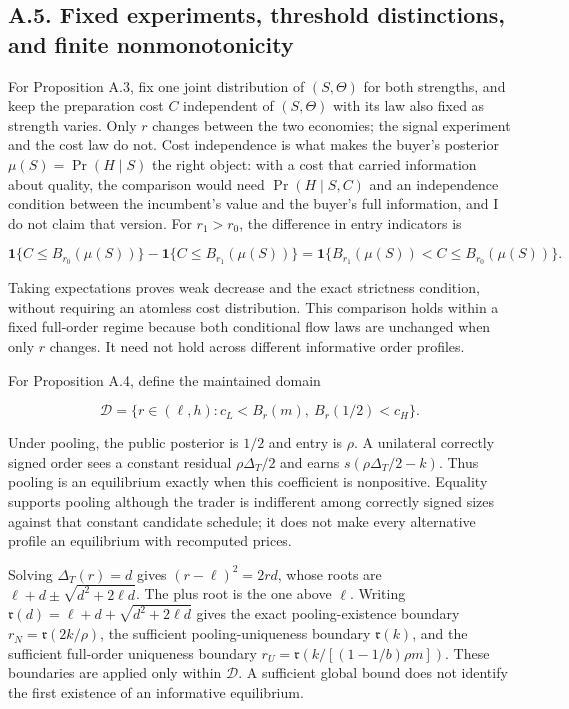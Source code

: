 \documentclass[
  11pt,
]{article}
\begin{document}
\subsection{A.5. Fixed experiments, threshold distinctions, and finite
nonmonotonicity}\label{oa-a-thresholds}

For Proposition A.3, fix one joint distribution of \((S,\Theta)\) for
both strengths, and keep the preparation cost \(C\) independent of
\((S,\Theta)\) with its law also fixed as strength varies. Only \(r\)
changes between the two economies; the signal experiment and the cost
law do not. Cost independence is what makes the buyer's posterior
\(\mu(S)=\Pr(H\mid S)\) the right object: with a cost that carried
information about quality, the comparison would need \(\Pr(H\mid S,C)\)
and an independence condition between the incumbent's value and the
buyer's full information, and I do not claim that version. For
\(r_1>r_0\), the difference in entry indicators is

\[
\mathbf1\{C\le B_{r_0}(\mu(S))\}
-\mathbf1\{C\le B_{r_1}(\mu(S))\}
=\mathbf1\{B_{r_1}(\mu(S))<C\le B_{r_0}(\mu(S))\}.
\tag{OA.18}\label{eq:oa-oa-18}
\]

Taking expectations proves weak decrease and the exact strictness
condition, without requiring an atomless cost distribution. This
comparison holds within a fixed full-order regime because both
conditional flow laws are unchanged when only \(r\) changes. It need not
hold across different informative order profiles.

For Proposition A.4, define the maintained domain

\[
\mathcal D=\{r\in(\ell,h):c_L<B_r(m),\ B_r(1/2)<c_H\}.
\tag{OA.19}\label{eq:oa-oa-19}
\]

Under pooling, the public posterior is \(1/2\) and entry is \(\rho\). A
unilateral correctly signed order sees a constant residual
\(\rho\Delta_T/2\) and earns \(s(\rho\Delta_T/2-k)\). Thus pooling is an
equilibrium exactly when this coefficient is nonpositive. Equality
supports pooling although the trader is indifferent among correctly
signed sizes against that constant candidate schedule; it does not make
every alternative profile an equilibrium with recomputed prices.

Solving \(\Delta_T(r)=d\) gives \((r-\ell)^2=2rd\), whose roots are
\(\ell+d\pm\sqrt{d^2+2\ell d}\). The plus root is the one above
\(\ell\). Writing \(\mathfrak r(d)=\ell+d+\sqrt{d^2+2\ell d}\) gives the
exact pooling-existence boundary \(r_N=\mathfrak r(2k/\rho)\), the
sufficient pooling-uniqueness boundary \(\mathfrak r(k)\), and the
sufficient full-order uniqueness boundary
\(r_U=\mathfrak r(k/[(1-1/b)\rho m])\). These boundaries are applied
only within \(\mathcal D\). A sufficient global bound does not identify
the first existence of an informative equilibrium.
\end{document}
